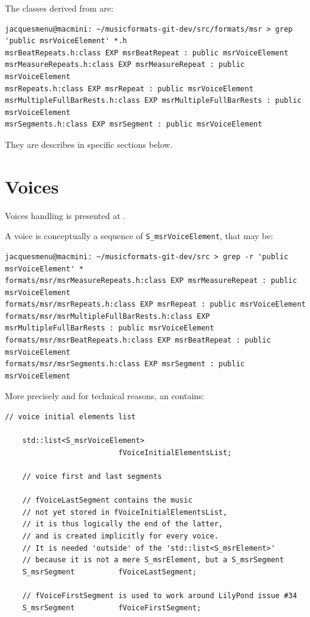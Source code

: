The classes derived from  are:
\begin{lstlisting}[language=Terminal]
jacquesmenu@macmini: ~/musicformats-git-dev/src/formats/msr > grep 'public msrVoiceElement' *.h
msrBeatRepeats.h:class EXP msrBeatRepeat : public msrVoiceElement
msrMeasureRepeats.h:class EXP msrMeasureRepeat : public msrVoiceElement
msrRepeats.h:class EXP msrRepeat : public msrVoiceElement
msrMultipleFullBarRests.h:class EXP msrMultipleFullBarRests : public msrVoiceElement
msrSegments.h:class EXP msrSegment : public msrVoiceElement
\end{lstlisting}

They are describes in specific sections below.


\section{Voices}\label{Voices}

Voices handling is presented at .

A voice is conceptually a sequence of {\tt S_msrVoiceElement}, that may be:
\begin{lstlisting}[language=Terminal]
jacquesmenu@macmini: ~/musicformats-git-dev/src > grep -r 'public msrVoiceElement' *
formats/msr/msrMeasureRepeats.h:class EXP msrMeasureRepeat : public msrVoiceElement
formats/msr/msrRepeats.h:class EXP msrRepeat : public msrVoiceElement
formats/msr/msrMultipleFullBarRests.h:class EXP msrMultipleFullBarRests : public msrVoiceElement
formats/msr/msrBeatRepeats.h:class EXP msrBeatRepeat : public msrVoiceElement
formats/msr/msrSegments.h:class EXP msrSegment : public msrVoiceElement
\end{lstlisting}

More precisely and for technical reasons, an  contains:
\begin{lstlisting}[language=CPlusPlus]
    // voice initial elements list

    std::list<S_msrVoiceElement>
                          fVoiceInitialElementsList;

    // voice first and last segments

    // fVoiceLastSegment contains the music
    // not yet stored in fVoiceInitialElementsList,
    // it is thus logically the end of the latter,
    // and is created implicitly for every voice.
    // It is needed 'outside' of the 'std::list<S_msrElement>'
    // because it is not a mere S_msrElement, but a S_msrSegment
    S_msrSegment          fVoiceLastSegment;

    // fVoiceFirstSegment is used to work around LilyPond issue #34
    S_msrSegment          fVoiceFirstSegment;
\end{lstlisting}

